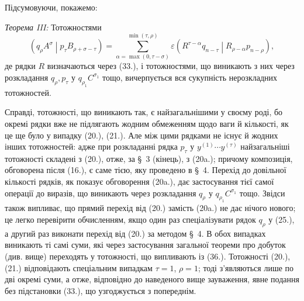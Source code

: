 \documentclass[11pt]{article}
\newcommand{\pair}[2]{\left(#1\middle|#2\right)}
\newcommand{\eps}{\varepsilon}
\begin{document}
Підсумовуючи, покажемо:

\emph{Теорема III:} Тотожностями
\begin{equation}
 \pair{q_\rho A^\sigma}{p_\tau B_{\rho+\sigma-\tau}}
 =\sum_{\alpha=\max(0,\tau-\sigma)}^{\min(\tau,\rho)}
 \eps\pair{R^{\tau-\alpha}q_{n-\tau}}{R_{\rho-\alpha}p_{n-\rho}},
\tag{36}
\end{equation}
де рядки $R$ визначаються через (33.), і тотожностями, що виникають з них через розкладання $q_\rho,p_\tau$ у $q_{\rho_1}C^{\sigma_1}$ тощо, вичерпується вся сукупність нерозкладних тотожностей.

Справді, тотожності, що виникають так, є найзагальнішими у своєму роді, бо окремі рядки вже не підлягають жодним обмеженням щодо ваги й кількості, як це ще було у випадку (20.), (21.). Але між цими рядками не існує й жодних інших тотожностей: адже при розкладанні рядка $p_\tau$ у $y^{(1)}\cdots y^{(\tau)}$ найзагальніші тотожності складені з (20.), отже, за \S\ 3 (кінець), з (20a.); причому композиція, обговорена після (16.), є саме тією, яку проведено в \S\ 4. Перехід до довільної кількості рядків, як показує обговорення (20a.), дає застосування тієї самої операції до виразів, що виникають через розкладання $q_\rho$ у $q_{\rho_1}C^{\sigma_1}$ тощо. Звідси також випливає, що прямий перехід від (20.) замість (20a.) не дає нічого нового; це легко перевірити обчисленням, якщо один раз спеціалізувати рядок $q_\rho$ у (25.), а другий раз виконати перехід від (20.) за методом \S\ 4. В обох випадках виникають ті самі суми, які через застосування загальної теореми про добуток (див. вище) переходять у тотожності, що випливають із (36.). Тотожності (20.), (21.) відповідають спеціальним випадкам $\tau=1$, $\rho=1$; тоді з'являються лише по дві окремі суми, а отже, відповідно до наведеного вище зауваження, явне подання без підстановки (33.), що узгоджується з попереднім.
\end{document}

